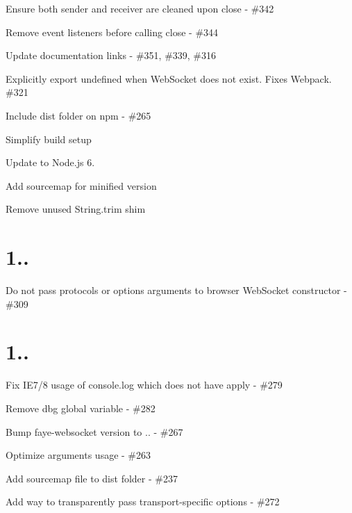 
\begin{DoxyItemize}
\item Ensure both sender and receiver are cleaned upon close -\/ \#342
\item Remove event listeners before calling {\ttfamily close} -\/ \#344
\item Update documentation links -\/ \#351, \#339, \#316
\item Explicitly export {\ttfamily undefined} when {\ttfamily Web\+Socket} does not exist. Fixes Webpack. \#321
\item Include {\ttfamily dist} folder on npm -\/ \#265
\item Simplify build setup
\item Update to Node.\+js 6.
\item Add sourcemap for minified version
\item Remove unused String.\+trim shim
\end{DoxyItemize}

\section*{1.. }


\begin{DoxyItemize}
\item Do not pass {\ttfamily protocols} or {\ttfamily options} arguments to browser Web\+Socket constructor -\/ \#309
\end{DoxyItemize}

\section*{1.. }


\begin{DoxyItemize}
\item Fix I\+E7/8 usage of {\ttfamily console.\+log} which does not have {\ttfamily apply} -\/ \#279
\item Remove {\ttfamily dbg} global variable -\/ \#282
\item Bump {\ttfamily faye-\/websocket} version to {..} -\/ \#267
\item Optimize {\ttfamily arguments} usage -\/ \#263
\item Add sourcemap file to dist folder -\/ \#237
\item Add way to transparently pass transport-\/specific options -\/ \#272
\end{DoxyItemize}

